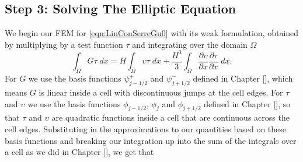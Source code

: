 \subsection{Step 3: Solving The Elliptic Equation}
We begin our FEM for \eqref{eqn:LinConSerreGu0} with its weak formulation, obtained by multiplying by a test function $\tau$ and integrating over the domain $\Omega$
\begin{equation*}
\int_{\Omega}G \tau \; dx =  H\int_{\Omega} \upsilon \tau \; dx  + \frac{H^3}{3} \int_{\Omega} \frac{\partial \upsilon}{\partial x } \frac{\partial \tau}{\partial x }\; dx.
\end{equation*}
For $G$ we use the basis functions $\psi^+_{j - 1/2}$ and $\psi^-_{j + 1/2}$ defined in Chapter [], which means $G$ is linear inside a cell with discontinuous jumps at the cell edges. For $\tau$ and $\upsilon$ we use the basis functions $\phi_{j-1/2}$, $\phi_{j}$ and $\phi_{j+1/2}$ defined in Chapter [], so that $\tau$ and $\upsilon$ are quadratic functions inside a cell that are continuous across the cell edges. Substituting in the approximations to our quantities based on these basis functions and breaking our integration up into the sum of the integrals over a cell as we did in Chapter [], we get that

